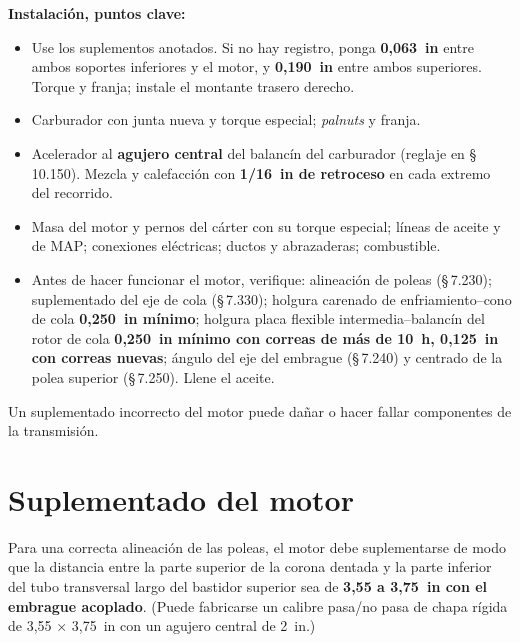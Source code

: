 \textbf{Instalación, puntos clave:}
\begin{itemize}
\item Use los suplementos anotados. Si no hay registro, ponga \textbf{0,063~in} entre ambos soportes inferiores y el motor, y \textbf{0,190~in} entre ambos superiores. Torque y franja; instale el montante trasero derecho.
\item Carburador con junta nueva y torque especial; \emph{palnuts} y franja.
\item Acelerador al \textbf{agujero central} del balancín del carburador (reglaje en \S\,10.150). Mezcla y calefacción con \textbf{1/16~in de retroceso} en cada extremo del recorrido.
\item Masa del motor y pernos del cárter con su torque especial; líneas de aceite y de MAP; conexiones eléctricas; ductos y abrazaderas; combustible.
\item Antes de hacer funcionar el motor, verifique: alineación de poleas (\S\,7.230); suplementado del eje de cola (\S\,7.330); holgura carenado de enfriamiento--cono de cola \textbf{0,250~in mínimo}; holgura placa flexible intermedia--balancín del rotor de cola \textbf{0,250~in mínimo con correas de más de 10~h, 0,125~in con correas nuevas}; ángulo del eje del embrague (\S\,7.240) y centrado de la polea superior (\S\,7.250). Llene el aceite.
\end{itemize}

\begin{advertencia}
Un suplementado incorrecto del motor puede dañar o hacer fallar componentes de la transmisión.
\end{advertencia}

\section{Suplementado del motor}

Para una correcta alineación de las poleas, el motor debe suplementarse de modo que la distancia entre la parte superior de la corona dentada y la parte inferior del tubo transversal largo del bastidor superior sea de \textbf{3,55 a 3,75~in con el embrague acoplado}. (Puede fabricarse un calibre pasa/no pasa de chapa rígida de 3,55 × 3,75~in con un agujero central de 2~in.)

